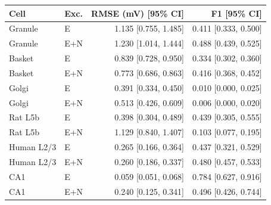 \begin{tabular}{llrr}
\toprule
Cell & Exc. & RMSE (mV) [95\% CI] & F1 [95\% CI]\\
\midrule
Granule & E & 1.135 [0.755, 1.485] & 0.411 [0.333, 0.500] \\
Granule & E+N & 1.230 [1.014, 1.444] & 0.488 [0.439, 0.525] \\
Basket & E & 0.839 [0.728, 0.950] & 0.334 [0.302, 0.360] \\
Basket & E+N & 0.773 [0.686, 0.863] & 0.416 [0.368, 0.452] \\
Golgi & E & 0.391 [0.334, 0.450] & 0.010 [0.000, 0.025] \\
Golgi & E+N & 0.513 [0.426, 0.609] & 0.006 [0.000, 0.020] \\
Rat L5b & E & 0.398 [0.304, 0.489] & 0.439 [0.305, 0.555] \\
Rat L5b & E+N & 1.129 [0.840, 1.407] & 0.103 [0.077, 0.195] \\
Human L2/3 & E & 0.265 [0.166, 0.364] & 0.437 [0.321, 0.529] \\
Human L2/3 & E+N & 0.260 [0.186, 0.337] & 0.480 [0.457, 0.533] \\
CA1 & E & 0.059 [0.051, 0.068] & 0.784 [0.627, 0.916] \\
CA1 & E+N & 0.240 [0.125, 0.341] & 0.496 [0.426, 0.744] \\
\bottomrule
\end{tabular}
